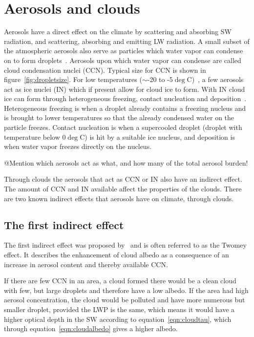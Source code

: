 \section{Aerosols and clouds}
Aerosols have a direct effect on the climate by scattering and absorbing SW radiation, and scattering, absorbing and emitting LW radiation. A small subset of the atmospheric aerosols also serve as particles which water vapor can condense on to form droplets~\citep{Wallace2006}. Aerosols upon which water vapor can condense are called cloud condensation nuclei (CCN). Typical size for CCN is shown in figure~\ref{fig:dropletsize}. For low temperatures ($\sim$-20 to -5$\deg$C)~\citep{Wallace2006}, a few aerosols act as ice nuclei (IN) which if present allow for cloud ice to form. With IN cloud ice can form through heterogeneous freezing, contact nucleation and deposition~\citep{Wallace2006}. Heterogeneous freezing is when a droplet already contains a freezing nucleus and is brought to lower temperatures so that the already condensed water on the particle freezes. Contact nucleation is when a supercooled droplet (droplet with temperature below 0$\deg$C) is hit by a suitable ice nucleus, and deposition is when water vapor freezes directly on the nucleus.

@Mention which aerosols act as what, and how many of the total aerosol burden!

Through clouds the aerosols that act as CCN or IN also have an indirect effect. The amount of CCN and IN available affect the properties of the clouds. There are two known indirect effects that aerosols have on climate, through clouds.
 
\subsection{The first indirect effect}
The first indirect effect was proposed by~\citet{Twomey1974} and is often referred to as the Twomey effect. It describes the enhancement of cloud albedo as a consequence of an increase in aerosol content and thereby available CCN.

If there are few CCN in an area, a cloud formed there would be a clean cloud with few, but large droplets and therefore have a low albedo. If the area had high aerosol concentration, the cloud would be polluted and have more numerous but smaller droplet, provided the LWP is the same, which means it would have a higher optical depth in the SW according to equation~\ref{eqn:cloudtau}, which through equation~\ref{eqn:cloudalbedo} gives a higher albedo.

